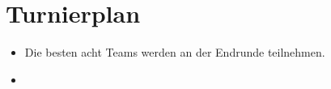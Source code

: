 \documentclass[a4paper,12pt]{article}
\begin{document}
\pagebreak
\section{Turnierplan}
\begin{itemize}
        \item Die besten acht Teams werden an der Endrunde teilnehmen.
        \item \tournamentQualification
\end{itemize}
\tournamentScoring
\combinedTournament
\end{document}
